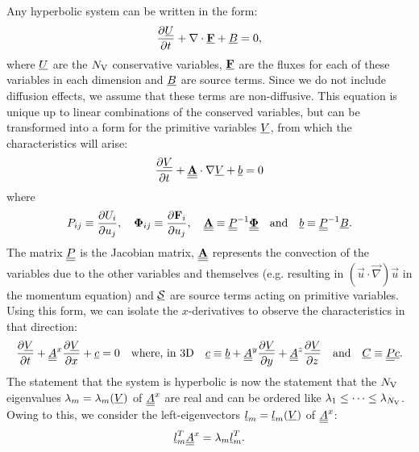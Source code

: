 
Any hyperbolic system can be written in the form:
\begin{equation} \label{eqn:hyp-source}
\pdv{\und{U}}{t} + \vec{\nabla}\cdot\und{\vec{F}} + \und{B} = 0,
\end{equation}
where $\und{U}$ are the $N_\rm{V}$ conservative variables, $\und{\vec{F}}$ are the fluxes for each of these variables in each dimension and $\und{B}$ are source terms. Since we do not include diffusion effects, we assume that these terms are non-diffusive. %
This equation is unique up to linear combinations of the conserved variables, but can be transformed into a form for the primitive variables $\und{V}$, from which the characteristics will arise:
\begin{equation}
\pdv{\und{V}}{t} + \undt{\vec{A}} \cdot \vec{\nabla} \und{V} + \und{b} = 0
\end{equation}
where
\begin{equation}
P_{ij} \equiv \pdv{U_i}{u_j},
\quad
\boldsymbol{\Phi}_{ij} \equiv \pdv{\vec{F}_i}{u_j},
\quad
\undt{\vec{A}} \equiv \undt{P}^{-1}\undt{\boldsymbol{\Phi}}
\quad \text{and} \quad
\und{b} \equiv \undt{{P}}^{-1}\und{B}.
\end{equation}
The matrix $\undt{P}$ is the Jacobian matrix, $\undt{\vec{A}}$ represents the convection of the variables due to the other variables and themselves (e.g. resulting in $(\vec{u} \cdot \vec{\nabla})\vec{u}$ in the momentum equation) and $\und{\cl{S}}$ are source terms acting on primitive variables. Using this form, we can isolate the $x$-derivatives to observe the characteristics in that direction:
\begin{equation} \label{eqn:with_A}
\pdv{\und{V}}{t} + \undt{A}^x \pdv{\und{V}}{x} + \und{c} = 0
\quad \text{where, in 3D} \quad
\und{c} \equiv \und{b} + \undt{A}^y \pdv{\und{V}}{y} + \undt{A}^z \pdv{\und{V}}{z}
\quad \text{and} \quad
\und{C} \equiv \undt{P} \und{c}.
\end{equation}
The statement that the system is hyperbolic is now the statement that the $N_\rm{V}$ eigenvalues $\l_m = \l_m(\und{V})$ of $\undt{A}^x$ are real and can be ordered like $\l_1 \leq \dots \leq \l_{N_\rm{V}}$. Owing to this, we consider the left-eigenvectors $\und{l}_m = \und{l}_m(\und{V})$ of $\undt{A}^x$:
\begin{equation}
\und{l}_m^T \undt{A}^x = \l_m \und{l}_m^T.
\end{equation}
